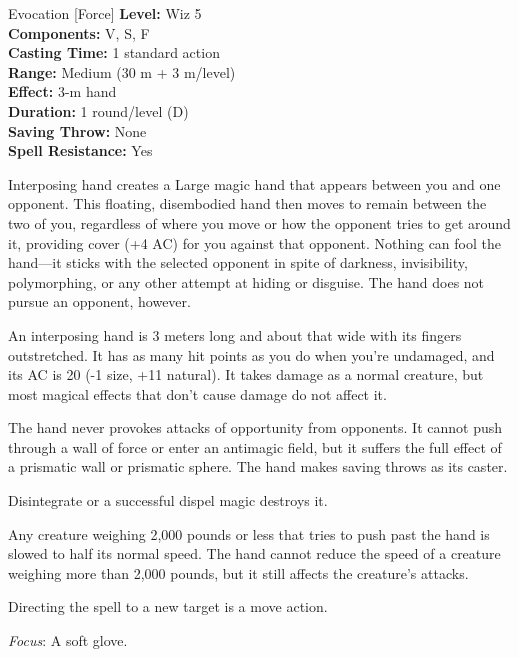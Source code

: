 {Evocation [Force]}
{
	\textbf{Level:}
	Wiz 5\\
	\textbf{Components:}
	V, S, F\\
	\textbf{Casting Time:}
	1 standard action\\
	\textbf{Range:}
	Medium (30 m + 3 m/level)\\
	\textbf{Effect:}
	3-m hand\\
	\textbf{Duration:}
	1 round/level (D)\\
	\textbf{Saving Throw:}
	None\\
	\textbf{Spell Resistance:}
	Yes\\
}
{
	Interposing hand creates a Large magic hand that appears between you and one opponent. This floating, disembodied hand then moves to remain between the two of you, regardless of where you move or how the opponent tries to get around it, providing cover (+4 AC) for you against that opponent. Nothing can fool the hand---it sticks with the selected opponent in spite of darkness, invisibility, polymorphing, or any other attempt at hiding or disguise. The hand does not pursue an opponent, however.

	An interposing hand is 3 meters long and about that wide with its fingers outstretched. It has as many hit points as you do when you're undamaged, and its AC is 20 (-1 size, +11 natural). It takes damage as a normal creature, but most magical effects that don't cause damage do not affect it.

	The hand never provokes attacks of opportunity from opponents. It cannot push through a wall of force or enter an antimagic field, but it suffers the full effect of a prismatic wall or prismatic sphere. The hand makes saving throws as its caster.

Disintegrate or a successful dispel magic destroys it.

	Any creature weighing 2,000 pounds or less that tries to push past the hand is slowed to half its normal speed. The hand cannot reduce the speed of a creature weighing more than 2,000 pounds, but it still affects the creature's attacks.

	Directing the spell to a new target is a move action.

	\textit{Focus}:
	A soft glove.

}
